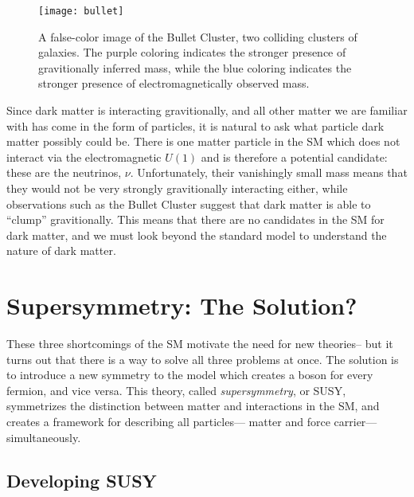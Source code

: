 
\begin{figure}
\centering
\texttt{[image: bullet]}
\label{fig:susy:bullet}
\caption{A false-color image of the Bullet Cluster, two colliding clusters of galaxies. The purple coloring indicates the stronger presence of gravitionally inferred mass, while the blue coloring indicates the stronger presence of electromagnetically observed mass.}
\end{figure}


Since dark matter is interacting gravitionally, and all other matter we are familiar with has come in the form of particles, it is natural to ask what particle dark matter possibly could be. There is one matter particle in the SM which does not interact via the electromagnetic $U(1)$ and is therefore a potential candidate: these are the neutrinos, $\nu$. Unfortunately, their vanishingly small mass means that they would not be very strongly gravitionally interacting either, while observations such as the Bullet Cluster suggest that dark matter is able to ``clump'' gravitionally. This means that there are no candidates in the SM for dark matter, and we must look beyond the standard model to understand the nature of dark matter.


\section{Supersymmetry: The Solution?}


These three shortcomings of the SM motivate the need for new theories-- but it turns out that there is a way to solve all three problems at once. The solution is to introduce a new symmetry to the model which creates a boson for every fermion, and vice versa. This theory, called \textit{supersymmetry}, or SUSY,   symmetrizes the distinction between matter and interactions in the SM, and creates a framework for describing all particles--- matter and force carrier--- simultaneously.


\subsection{Developing SUSY} 

\label{chapter:susy:susy:developing}

